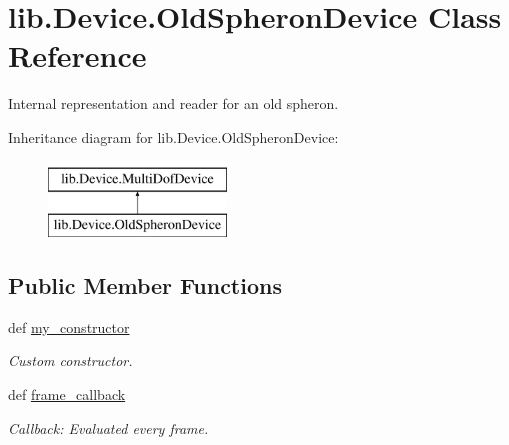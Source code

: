 \hypertarget{classlib_1_1Device_1_1OldSpheronDevice}{\section{lib.\-Device.\-Old\-Spheron\-Device \-Class \-Reference}
\label{classlib_1_1Device_1_1OldSpheronDevice}
}


\-Internal representation and reader for an old spheron.  


\-Inheritance diagram for lib.\-Device.\-Old\-Spheron\-Device\-:\begin{figure}[H]
\begin{center}
\leavevmode
\includegraphics[height=2.000000cm]{classlib_1_1Device_1_1OldSpheronDevice}
\end{center}
\end{figure}
\subsection*{\-Public \-Member \-Functions}
\begin{DoxyCompactItemize}
\item 
def \hyperlink{classlib_1_1Device_1_1OldSpheronDevice_a37bdcbbad80feb7567fdae8873bd3173}{my\-\_\-constructor}
\begin{DoxyCompactList}\small\item\em \-Custom constructor. \end{DoxyCompactList}\item 
def \hyperlink{classlib_1_1Device_1_1OldSpheronDevice_a7635b290ae8265eedae17a9773a9bcc8}{frame\-\_\-callback}
\begin{DoxyCompactList}\small\item\em \-Callback\-: \-Evaluated every frame. \end{DoxyCompactList}\end{DoxyCompactItemize}
